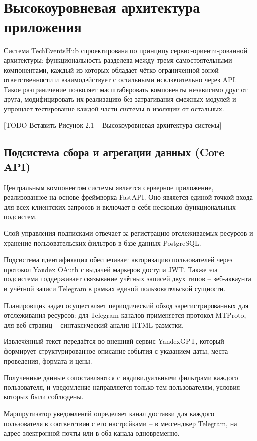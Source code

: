 \section{Высокоуровневая архитектура приложения}

Система TechEventsHub спроектирована по принципу сервис-ориенти-рованной архитектуры: функциональность разделена между тремя самостоятельными компонентами, каждый из которых обладает чётко ограниченной зоной ответственности и взаимодействует с остальными исключительно через API. 
Такое разграничение позволяет масштабировать компоненты независимо друг от друга, модифицировать их реализацию без затрагивания смежных модулей и упрощает тестирование каждой части системы в изоляции от остальных.

[TODO Вставить Рисунок 2.1 -- Высокоуровневая архитектура системы]

\subsection*{Подсистема сбора и агрегации данных (Core API)}

Центральным компонентом системы является серверное приложение, реализованное на основе фреймворка FastAPI. 
Оно является единой точкой входа для всех клиентских запросов и включает в себя несколько функциональных подсистем. 

Слой управления подписками отвечает за регистрацию отслеживаемых ресурсов и хранение пользовательских фильтров в базе данных PostgreSQL. 

Подсистема идентификации обеспечивает авторизацию пользователей через протокол Yandex OAuth с выдачей маркеров доступа JWT. 
Также эта подсистема поддерживает связывание учётных записей двух типов -- веб-аккаунта и учётной записи Telegram в рамках единой пользовательской сущности. 

Планировщик задач осуществляет периодический обход зарегистрированных для отслеживания ресурсов: для Telegram-каналов применяется протокол MTProto, для веб-страниц -- синтаксический анализ HTML-разметки. 

Извлечённый текст передаётся во внешний сервис YandexGPT, который формирует структурированное описание события с указанием даты, места проведения, формата и цены. 

Полученные данные сопоставляются с индивидуальными фильтрами каждого пользователя, и уведомление направляется только тем пользователям, условия которых были соблюдены. 

Маршрутизатор уведомлений определяет канал доставки для каждого пользователя в соответствии с его настройками -- в мессенджер Telegram, на адрес электронной почты или в оба канала одновременно.

